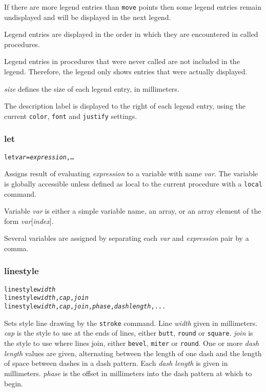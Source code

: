 If there are more legend entries than 
\texttt{move} points then some legend entries
remain undisplayed and will be displayed in the next legend.

Legend entries are displayed in the order in which they
are encountered in called procedures.

Legend entries in procedures that were never called are
not included in the legend.  Therefore, the legend only shows
entries that were actually displayed.

\textit{size} defines the size of each legend entry, in millimeters.

The description label is displayed to the right of each legend entry, using the
current \texttt{color}, \texttt{font} and \texttt{justify} settings.

\subsubsection{let}

\begin{alltt}
let \textit{var} = \textit{expression}, \dots
\end{alltt}

Assigns result of evaluating \textit{expression} to a variable with name
\textit{var}.  The variable is globally accessible unless defined as local to
the current procedure with a \texttt{local} command.

Variable \textit{var} is either a simple variable name, an array, or an array
element of the form \textit{var}[\textit{index}].

Several variables are assigned by separating each 
\textit{var} and \textit{expression} pair by a comma.

\subsubsection{linestyle}

\begin{alltt}
linestyle \textit{width}
linestyle \textit{width}, \textit{cap}, \textit{join}
linestyle \textit{width}, \textit{cap}, \textit{join}, \textit{phase}, \textit{dash length}, ...
\end{alltt}

Sets style line drawing by the \texttt{stroke}
command.
Line \textit{width} given in millimeters.
\textit{cap} is the style to use at the ends of lines, either
\texttt{butt}, \texttt{round} or \texttt{square}.
\textit{join} is the style to use where lines join, either
\texttt{bevel}, \texttt{miter} or \texttt{round}.
One or more \textit{dash length} values are given, alternating
between the length of one dash and the length of space between
dashes in a dash pattern.  Each \textit{dash length} is given in millimeters.
\textit{phase} is the offset in millimeters into the dash pattern 
at which to begin.


